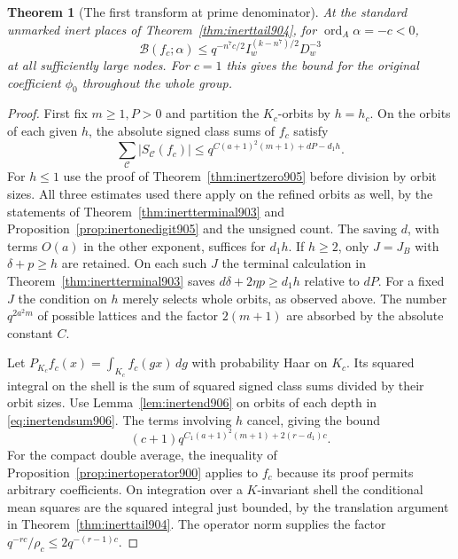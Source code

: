 \documentclass[a4paper,11pt]{article}
\newtheorem{theorem}[proposition]{Theorem}
\theoremstyle{definition}
\theoremstyle{remark}
\numberwithin{equation}{section}
\begin{document}
\begin{theorem}[The first transform at prime denominator]
\leavevmode\label{thm:inertprime906}
At the standard unmarked inert places of
Theorem~\ref{thm:inerttail904}, for \(\operatorname{ord}_A\alpha=-c<0\),
\[
          \mathcal B(f_c;\alpha)
             \le q^{-n^7c/2} I_w^{(k-n^7)/2}D_w^{-3}
\]
at all sufficiently large nodes. For \(c=1\) this gives the
bound for the original coefficient \(\phi_0\) throughout the
whole group.
\end{theorem}
\begin{proof}
First fix \(m\ge1,P>0\) and partition the \(K_c\)-orbits by
\(h=h_c\). On the orbits of each given \(h\), the absolute
signed class sums of \(f_c\) satisfy
\begin{equation}
      \sum_{\mathcal C}|S_{\mathcal C}(f_c)|
                \le q^{C(a+1)^2(m+1)+dP-d_1h}.
 \label{eq:inertendsum906}
\end{equation}
For \(h\le1\) use the proof of Theorem~\ref{thm:inertzero905}
before division by orbit sizes. All three estimates used there
apply on the refined orbits as well, by the statements of
Theorem~\ref{thm:inertterminal903} and
Proposition~\ref{prop:inertonedigit905} and the unsigned count.
The saving \(d\), with terms \(O(a)\) in the other exponent,
suffices for \(d_1h\). If \(h\ge2\), only \(J=J_B\) with
\(\delta+p\ge h\) are retained. On each such \(J\) the terminal
calculation in Theorem~\ref{thm:inertterminal903} saves
\(d\delta+2\eta p\ge d_1h\) relative to \(dP\).
For a fixed \(J\) the condition on \(h\) merely selects whole
orbits, as observed above. The number \(q^{2a^2m}\) of
possible lattices and the factor \(2(m+1)\) are absorbed by the
absolute constant \(C\).

Let \(P_{K_c}f_c(x)=\int_{K_c} f_c(gx)\,dg\) with probability
Haar on \(K_c\). Its squared integral on the shell is the sum
of squared signed class sums divided by their orbit sizes.
Use Lemma~\ref{lem:inertend906} on orbits of each depth in
\eqref{eq:inertendsum906}. The terms involving \(h\) cancel,
giving the bound
\[
        (c+1)q^{C_1(a+1)^2(m+1)+2(r-d_1)c}.
\]
For the compact double average, the inequality of
Proposition~\ref{prop:inertoperator900} applies to \(f_c\)
because its proof permits arbitrary coefficients. On integration
over a \(K\)-invariant shell the conditional mean squares are the
squared integral just bounded, by the translation argument in
Theorem~\ref{thm:inerttail904}. The operator norm supplies the
factor \(q^{-rc}/\rho_c\le2q^{-(r-1)c}\).


\end{proof}
\end{document}
